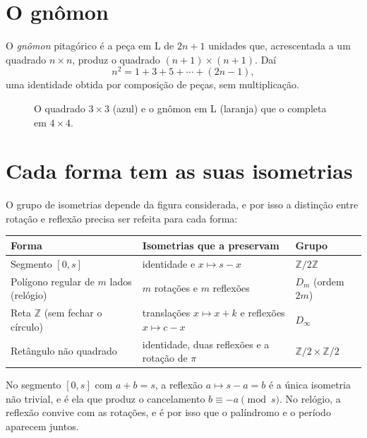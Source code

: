 \documentclass[12pt,a4paper]{article}
\theoremstyle{definition}
\newcommand{\Z}{\mathbb{Z}}
\begin{document}
\section{O gnômon}

O \emph{gnômon} pitagórico é a peça em L de $2n+1$ unidades que, acrescentada a um quadrado $n\times n$, produz o quadrado $(n+1)\times(n+1)$. Daí
\[
n^2=1+3+5+\cdots+(2n-1),
\]
uma identidade obtida por composição de peças, sem multiplicação.

\begin{figure}[htbp]
\centering
{}
\caption{O quadrado $3\times3$ (azul) e o gnômon em L (laranja) que o completa em $4\times4$.}
\end{figure}

\section{Cada forma tem as suas isometrias}

O grupo de isometrias depende da figura considerada, e por isso a distinção entre rotação e reflexão precisa ser refeita para cada forma:

\begin{center}
\begin{tabular}{lll}
\hline
Forma & Isometrias que a preservam & Grupo\\
\hline
Segmento $[0,s]$ & identidade e $x\mapsto s-x$ & $\Z/2\Z$\\
Polígono regular de $m$ lados (relógio) & $m$ rotações e $m$ reflexões & $D_m$ (ordem $2m$)\\
Reta $\Z$ (sem fechar o círculo) & translações $x\mapsto x+k$ e reflexões $x\mapsto c-x$ & $D_\infty$\\
Retângulo não quadrado & identidade, duas reflexões e a rotação de $\pi$ & $\Z/2\times\Z/2$\\
\hline
\end{tabular}
\end{center}

No segmento $[0,s]$ com $a+b=s$, a reflexão $a\mapsto s-a=b$ é a única isometria não trivial, e é ela que produz o cancelamento $b\equiv -a \pmod s$. No relógio, a reflexão convive com as rotações, e é por isso que o palíndromo e o período aparecem juntos.
\end{document}
